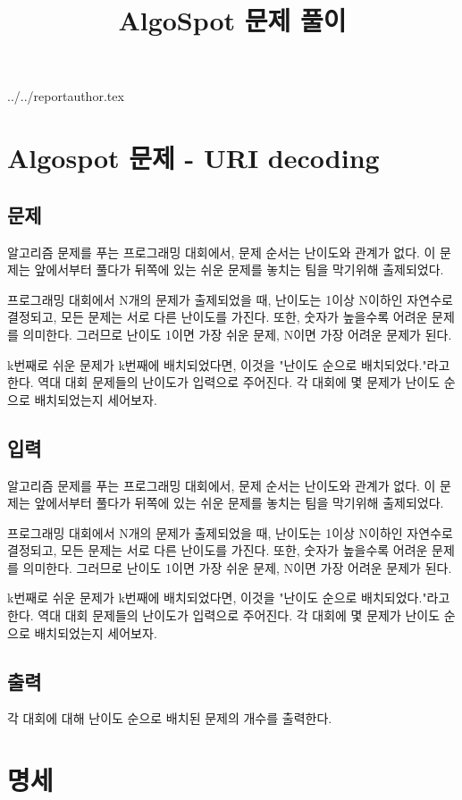 \documentclass {article}
\begin{document}
\title {AlgoSpot 문제 풀이}
 {../../reportauthor.tex}
\maketitle

\section {Algospot 문제 - URI decoding}
\subsection {문제}
알고리즘 문제를 푸는 프로그래밍 대회에서, 문제 순서는 난이도와 관계가 없다. 이 문제는 앞에서부터 풀다가 뒤쪽에 있는 쉬운 문제를 놓치는 팀을 막기위해 출제되었다.

프로그래밍 대회에서 N개의 문제가 출제되었을 때, 난이도는 1이상 N이하인 자연수로 결정되고, 모든 문제는 서로 다른 난이도를 가진다. 또한, 숫자가 높을수록 어려운 문제를 의미한다. 그러므로 난이도 1이면 가장 쉬운 문제, N이면 가장 어려운 문제가 된다.

k번째로 쉬운 문제가 k번째에 배치되었다면, 이것을 "난이도 순으로 배치되었다."라고 한다. 역대 대회 문제들의 난이도가 입력으로 주어진다. 각 대회에 몇 문제가 난이도 순으로 배치되었는지 세어보자.

\subsection {입력}
알고리즘 문제를 푸는 프로그래밍 대회에서, 문제 순서는 난이도와 관계가 없다. 이 문제는 앞에서부터 풀다가 뒤쪽에 있는 쉬운 문제를 놓치는 팀을 막기위해 출제되었다.

프로그래밍 대회에서 N개의 문제가 출제되었을 때, 난이도는 1이상 N이하인 자연수로 결정되고, 모든 문제는 서로 다른 난이도를 가진다. 또한, 숫자가 높을수록 어려운 문제를 의미한다. 그러므로 난이도 1이면 가장 쉬운 문제, N이면 가장 어려운 문제가 된다.

k번째로 쉬운 문제가 k번째에 배치되었다면, 이것을 "난이도 순으로 배치되었다."라고 한다. 역대 대회 문제들의 난이도가 입력으로 주어진다. 각 대회에 몇 문제가 난이도 순으로 배치되었는지 세어보자.

\subsection {출력}
각 대회에 대해 난이도 순으로 배치된 문제의 개수를 출력한다.

\section {명세}
\end{document}
